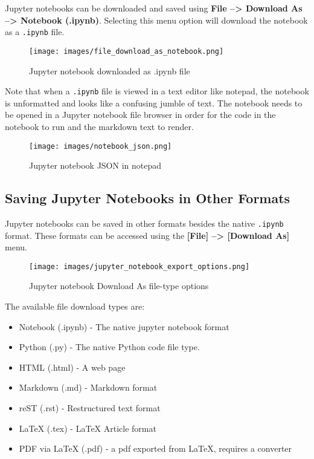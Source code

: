 \documentclass{book}
\makeatletter
\def\maxwidth{\ifdim\Gin@nat@width>\linewidth\linewidth
\else\Gin@nat@width\fi}
\let\Oldincludegraphics\includegraphics
\renewcommand{\includegraphics}[1]{\Oldincludegraphics[width=.8\maxwidth]{#1}}
\providecommand{\tightlist}{%
      \setlength{\itemsep}{0pt}\setlength{\parskip}{0pt}}
\newcommand{\passthrough}[1]{#1}
\makeatother
\begin{document}
Jupyter notebooks can be downloaded and saved using \textbf{File
--\textgreater{} Download As --\textgreater{} Notebook (.ipynb)}.
Selecting this menu option will download the notebook as a
\passthrough{\lstinline!.ipynb!} file.

\begin{figure}
\centering
\texttt{[image: images/file\_download\_as\_notebook.png]}
\caption{Jupyter notebook downloaded as .ipynb file}
\end{figure}

Note that when a \passthrough{\lstinline!.ipynb!} file is viewed in a
text editor like notepad, the notebook is unformatted and looks like a
confusing jumble of text. The notebook needs to be opened in a Jupyter
notebook file browser in order for the code in the notebook to run and
the markdown text to render.

\begin{figure}
\centering
\texttt{[image: images/notebook\_json.png]}
\caption{Jupyter notebook JSON in notepad}
\end{figure}
    




    
        \hypertarget{saving-jupyter-notebooks-in-other-formats}{%
\subsection{Saving Jupyter Notebooks in Other
Formats}\label{saving-jupyter-notebooks-in-other-formats}}

Jupyter notebooks can be saved in other formats besides the native
\passthrough{\lstinline!.ipynb!} format. These formats can be accessed
using the \textbf{{[}File{]} --\textgreater{} {[}Download As{]}} menu.

\begin{figure}
\centering
\texttt{[image: images/jupyter\_notebook\_export\_options.png]}
\caption{Jupyter notebook Download As file-type options}
\end{figure}

The available file download types are:

\begin{itemize}
\tightlist
\item
  Notebook (.ipynb) - The native jupyter notebook format
\item
  Python (.py) - The native Python code file type.
\item
  HTML (.html) - A web page
\item
  Markdown (.md) - Markdown format
\item
  reST (.rst) - Restructured text format
\item
  LaTeX (.tex) - LaTeX Article format
\item
  PDF via LaTeX (.pdf) - a pdf exported from LaTeX, requires a converter
\end{itemize}
\end{document}
